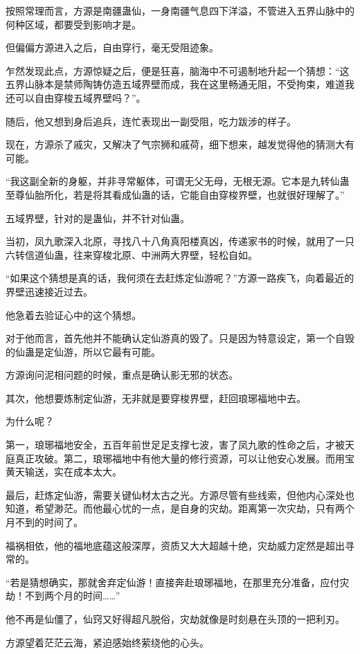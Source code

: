 \begin{this_body}
按照常理而言，方源是南疆蛊仙，一身南疆气息四下洋溢，不管进入五界山脉中的何种区域，都要受到影响才是。

但偏偏方源进入之后，自由穿行，毫无受阻迹象。

乍然发现此点，方源惊疑之后，便是狂喜，脑海中不可遏制地升起一个猜想：“这五界山脉本是禁师陶铸仿造五域界壁而成，我在这里畅通无阻，不受拘束，难道我还可以自由穿梭五域界壁吗？”。

随后，他又想到身后追兵，连忙表现出一副受阻，吃力跋涉的样子。

现在，方源杀了戚灾，又解决了气宗狮和戚荷，细下想来，越发觉得他的猜测大有可能。

“我这副全新的身躯，并非寻常躯体，可谓无父无母，无根无源。它本是九转仙蛊至尊仙胎所化，若是将其看成仙蛊的话，它能自由穿梭界壁，也就很好理解了。”

五域界壁，针对的是蛊仙，并不针对仙蛊。

当初，凤九歌深入北原，寻找八十八角真阳楼真凶，传递家书的时候，就用了一只六转信道仙蛊，往来穿梭北原、中洲两大界壁，轻松自如。

“如果这个猜想是真的话，我何须在去赶炼定仙游呢？”方源一路疾飞，向着最近的界壁迅速接近过去。

他急着去验证心中的这个猜想。

对于他而言，首先他并不能确认定仙游真的毁了。只是因为特意设定，第一个自毁的仙蛊是定仙游，所以它最有可能。

方源询问泥相问题的时候，重点是确认影无邪的状态。

其次，他想要炼制定仙游，无非就是要穿梭界壁，赶回琅琊福地中去。

为什么呢？

第一，琅琊福地安全，五百年前世足足支撑七波，害了凤九歌的性命之后，才被天庭真正攻破。第二，琅琊福地中有他大量的修行资源，可以让他安心发展。而用宝黄天输送，实在成本太大。

最后，赶炼定仙游，需要关键仙材太古之光。方源尽管有些线索，但他内心深处也知道，希望渺茫。而他最心忧的一点，是自身的灾劫。距离第一次灾劫，只有两个月不到的时间了。

福祸相依，他的福地底蕴这般深厚，资质又大大超越十绝，灾劫威力定然是超出寻常的。

“若是猜想确实，那就舍弃定仙游！直接奔赴琅琊福地，在那里充分准备，应付灾劫！不到两个月的时间……”

他不再是仙僵了，仙窍又好得超凡脱俗，灾劫就像是时刻悬在头顶的一把利刃。

方源望着茫茫云海，紧迫感始终萦绕他的心头。

\end{this_body}

